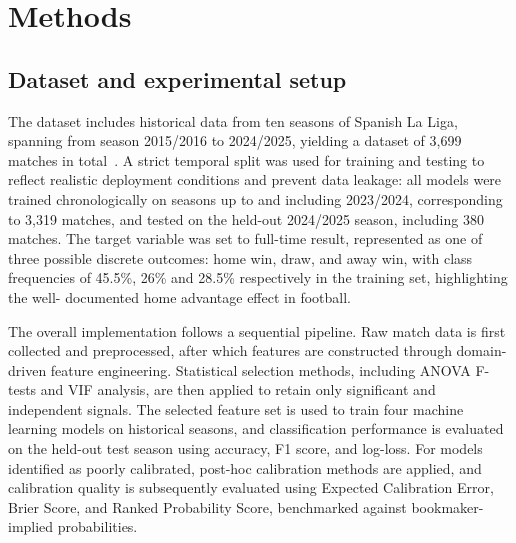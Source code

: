 \documentclass[conference]{IEEEtran}
\begin{document}
\section{Methods}
\subsection{Dataset and experimental setup}
The dataset includes historical data from ten seasons
of Spanish La Liga, spanning from season 2015/2016 to
2024/2025, yielding a dataset of 3,699 matches in total~\cite{b13}. A
strict temporal split was used for training and testing to reflect
realistic deployment conditions and prevent data leakage: all
models were trained chronologically on seasons up to and including
2023/2024, corresponding to 3,319 matches, and tested
on the held-out 2024/2025 season, including 380 matches.
The target variable was set to full-time result, represented
as one of three possible discrete outcomes: home win, draw,
and away win, with class frequencies of 45.5\%, 26\% and
28.5\% respectively in the training set, highlighting the well-
documented home advantage effect in football.

The overall implementation follows a sequential pipeline.
Raw match data is first collected and preprocessed, after which
features are constructed through domain-driven feature engineering.
Statistical selection methods, including ANOVA F-tests and VIF
analysis, are then applied to retain only significant and
independent signals. The selected feature set is used to train
four machine learning models on historical seasons, and
classification performance is evaluated on the held-out test
season using accuracy, F1 score, and log-loss. For models
identified as poorly calibrated, post-hoc calibration methods
are applied, and calibration quality is subsequently evaluated
using Expected Calibration Error, Brier Score, and Ranked
Probability Score, benchmarked against bookmaker-implied
probabilities.
\end{document}
